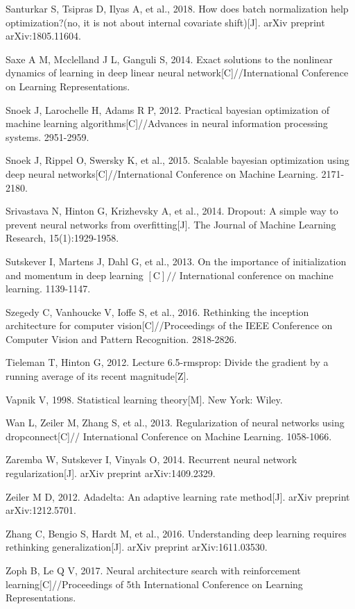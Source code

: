 \documentclass[10pt]{article}
\begin{document}
Santurkar S, Tsipras D, Ilyas A, et al., 2018. How does batch normalization help optimization?(no, it is not about internal covariate shift)[J]. arXiv preprint arXiv:1805.11604.

Saxe A M, Mcclelland J L, Ganguli S, 2014. Exact solutions to the nonlinear dynamics of learning in deep linear neural network[C]//International Conference on Learning Representations.

Snoek J, Larochelle H, Adams R P, 2012. Practical bayesian optimization of machine learning algorithms[C]//Advances in neural information processing systems. 2951-2959.

Snoek J, Rippel O, Swersky K, et al., 2015. Scalable bayesian optimization using deep neural networks[C]//International Conference on Machine Learning. 2171-2180.

Srivastava N, Hinton G, Krizhevsky A, et al., 2014. Dropout: A simple way to prevent neural networks from overfitting[J]. The Journal of Machine Learning Research, 15(1):1929-1958.

Sutskever I, Martens J, Dahl G, et al., 2013. On the importance of initialization and momentum in deep learning $[\mathrm{C}] / /$ International conference on machine learning. 1139-1147.

Szegedy C, Vanhoucke V, Ioffe S, et al., 2016. Rethinking the inception architecture for computer vision[C]//Proceedings of the IEEE Conference on Computer Vision and Pattern Recognition. 2818-2826.

Tieleman T, Hinton G, 2012. Lecture 6.5-rmsprop: Divide the gradient by a running average of its recent magnitude[Z].

Vapnik V, 1998. Statistical learning theory[M]. New York: Wiley.

Wan L, Zeiler M, Zhang S, et al., 2013. Regularization of neural networks using dropconnect[C]// International Conference on Machine Learning. 1058-1066.

Zaremba W, Sutskever I, Vinyals O, 2014. Recurrent neural network regularization[J]. arXiv preprint arXiv:1409.2329.

Zeiler M D, 2012. Adadelta: An adaptive learning rate method[J]. arXiv preprint arXiv:1212.5701.

Zhang C, Bengio S, Hardt M, et al., 2016. Understanding deep learning requires rethinking generalization[J]. arXiv preprint arXiv:1611.03530.

Zoph B, Le Q V, 2017. Neural architecture search with reinforcement learning[C]//Proceedings of 5th International Conference on Learning Representations.
\end{document}
